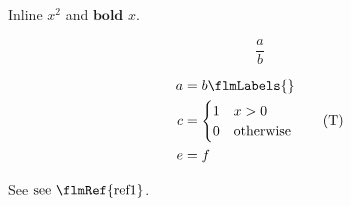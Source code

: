 Inline \(x^2\) and \(\textbf{bold } x\).

\[\frac{a}{b}\]

\begin{align}
  a &= b  \flmLabels{\label{ref1}}\\
  c &= \begin{cases} 1 & x > 0 \\ 0 & \text{otherwise} \end{cases}  \tag*{(T)}\\
  e &= f \nonumber\end{align}

See \(\text{see \flmRef{ref1}}\).%
